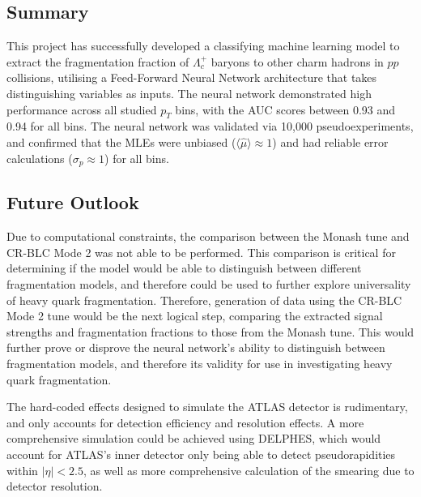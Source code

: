 \documentclass[12pt]{article}
\begin{document}
\subsection{Summary}
This project has successfully developed a classifying machine learning model to extract the fragmentation fraction of $\Lambda_c^+$ baryons to other charm hadrons in $pp$ collisions, utilising a Feed-Forward Neural Network architecture that takes distinguishing variables as inputs. The neural network demonstrated high performance across all studied $p_T$ bins, with the AUC scores between 0.93 and 0.94 for all bins. The neural network was validated via 10,000 pseudoexperiments, and confirmed that the MLEs were unbiased ($\langle \hat{\mu} \rangle \approx 1$) and had reliable error calculations ($\sigma_p \approx 1$) for all bins.


\subsection{Future Outlook}
Due to computational constraints, the comparison between the Monash tune and CR-BLC Mode 2 was not able to be performed. This comparison is critical for determining if the model would be able to distinguish between different fragmentation models, and therefore could be used to further explore universality of heavy quark fragmentation. Therefore, generation of data using the CR-BLC Mode 2 tune would be the next logical step,  comparing the extracted signal strengths and fragmentation fractions to those from the Monash tune. This would further prove or disprove the neural network's ability to distinguish between fragmentation models, and therefore its validity for use in investigating heavy quark fragmentation.

The hard-coded effects designed to simulate the ATLAS detector is rudimentary, and only accounts for detection efficiency and resolution effects. A more comprehensive simulation could be achieved using DELPHES, which would account for ATLAS's inner detector only being able to detect pseudorapidities within $|\eta| < 2.5$, as well as more comprehensive calculation of the smearing due to detector resolution.





\end{document}
